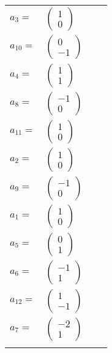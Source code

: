 \documentclass[1p]{elsarticle_modified}
\theoremstyle{definition}
\begin{document}
\begin{tabular}{m{7pt} m{180pt} m{7pt} m{180pt} }
\flushright $a_{3}=$&$\begin{pmatrix}1\\0\end{pmatrix}$ \\
\flushright $a_{10}=$&$\begin{pmatrix}0\\-1\end{pmatrix}$ \\
\flushright $a_{4}=$&$\begin{pmatrix}1\\1\end{pmatrix}$ \\
\flushright $a_{8}=$&$\begin{pmatrix}-1\\0\end{pmatrix}$ \\
\flushright $a_{11}=$&$\begin{pmatrix}1\\0\end{pmatrix}$ \\
\flushright $a_{2}=$&$\begin{pmatrix}1\\0\end{pmatrix}$ \\
\flushright $a_{9}=$&$\begin{pmatrix}-1\\0\end{pmatrix}$ \\
\flushright $a_{1}=$&$\begin{pmatrix}1\\0\end{pmatrix}$ \\
\flushright $a_{5}=$&$\begin{pmatrix}0\\1\end{pmatrix}$ \\
\flushright $a_{6}=$&$\begin{pmatrix}-1\\1\end{pmatrix}$ \\
\flushright $a_{12}=$&$\begin{pmatrix}1\\-1\end{pmatrix}$ \\
\flushright $a_{7}=$&$\begin{pmatrix}-2\\1\end{pmatrix}$\\&\end{tabular}
\end{document}
